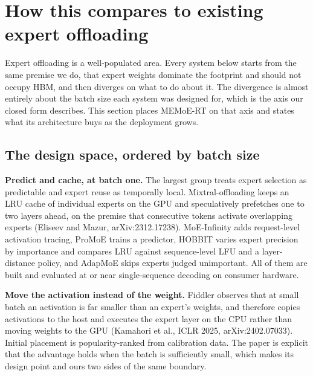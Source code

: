 
\section{How this compares to existing expert offloading}

Expert offloading is a well-populated area. Every system below starts from the
same premise we do, that expert weights dominate the footprint and should not
occupy HBM, and then diverges on what to do about it. The divergence is almost
entirely about the batch size each system was designed for, which is the axis our
closed form describes. This section places MEMoE-RT on that axis and states what
its architecture buys as the deployment grows.

\subsection{The design space, ordered by batch size}

\textbf{Predict and cache, at batch one.} The largest group treats expert
selection as predictable and expert reuse as temporally local.
Mixtral-offloading keeps an LRU cache of individual experts on the GPU and
speculatively prefetches one to two layers ahead, on the premise that consecutive
tokens activate overlapping experts (Eliseev and Mazur, arXiv:2312.17238).
MoE-Infinity adds request-level activation tracing, ProMoE trains a predictor,
HOBBIT varies expert precision by importance and compares LRU against
sequence-level LFU and a layer-distance policy, and AdapMoE skips experts judged
unimportant. All of them are built and evaluated at or near single-sequence
decoding on consumer hardware.

\textbf{Move the activation instead of the weight.} Fiddler observes that at
small batch an activation is far smaller than an expert's weights, and therefore
copies activations to the host and executes the expert layer on the CPU rather
than moving weights to the GPU (Kamahori et al., ICLR 2025, arXiv:2402.07033).
Initial placement is popularity-ranked from calibration data. The paper is
explicit that the advantage holds when the batch is sufficiently small, which
makes its design point and ours two sides of the same boundary.


